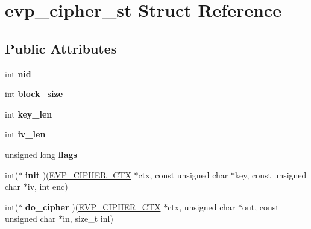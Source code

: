 \hypertarget{structevp__cipher__st}{}\section{evp\+\_\+cipher\+\_\+st Struct Reference}
\label{structevp__cipher__st}
\subsection*{Public Attributes}
\begin{DoxyCompactItemize}
\item 
\mbox{\label{structevp__cipher__st_a3e92a36ebcc6d193fa91f0edf7aa5561}} 
int {\bfseries nid}
\item 
\mbox{\label{structevp__cipher__st_a63036565998126ddd20ba6b1b901df28}} 
int {\bfseries block\+\_\+size}
\item 
\mbox{\label{structevp__cipher__st_a6f3df99c0808facaf1a5bb730cbd0b22}} 
int {\bfseries key\+\_\+len}
\item 
\mbox{\label{structevp__cipher__st_add3e3ebb7252cd8326a98d309877a134}} 
int {\bfseries iv\+\_\+len}
\item 
\mbox{\label{structevp__cipher__st_a84a16719073d93e98517a6b38c47ba3f}} 
unsigned long {\bfseries flags}
\item 
\mbox{\label{structevp__cipher__st_a1459fa00f4ae13d2f6ede957ec33165c}} 
int($\ast$ {\bfseries init} )(\hyperlink{structevp__cipher__ctx__st}{E\+V\+P\+\_\+\+C\+I\+P\+H\+E\+R\+\_\+\+C\+TX} $\ast$ctx, const unsigned char $\ast$key, const unsigned char $\ast$iv, int enc)
\item 
\mbox{\label{structevp__cipher__st_aa61fb3ac50f7917d1c00475f537d8328}} 
int($\ast$ {\bfseries do\+\_\+cipher} )(\hyperlink{structevp__cipher__ctx__st}{E\+V\+P\+\_\+\+C\+I\+P\+H\+E\+R\+\_\+\+C\+TX} $\ast$ctx, unsigned char $\ast$out, const unsigned char $\ast$in, size\+\_\+t inl)
\item 
\mbox{\label{structevp__cipher__st_ab5d28076841224e07599d579fb7c0d28}} 

\end{DoxyCompactItemize}
